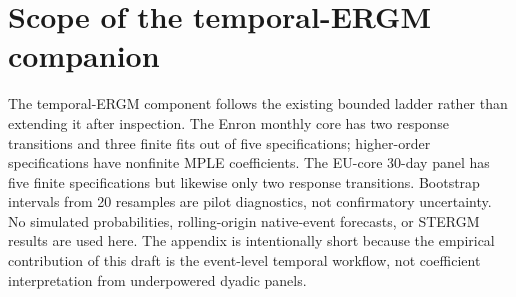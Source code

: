 \documentclass[11pt]{article}
\begin{document}
\appendix
\section{Scope of the temporal-ERGM companion}\label{app:btergm}



The temporal-ERGM component follows the existing bounded ladder rather than extending it after inspection. The Enron monthly core has two response transitions and three finite fits out of five specifications; higher-order specifications have nonfinite MPLE coefficients. The EU-core 30-day panel has five finite specifications but likewise only two response transitions. Bootstrap intervals from 20 resamples are pilot diagnostics, not confirmatory uncertainty. No simulated probabilities, rolling-origin native-event forecasts, or STERGM results are used here. The appendix is intentionally short because the empirical contribution of this draft is the event-level temporal workflow, not coefficient interpretation from underpowered dyadic panels.



\end{document}
